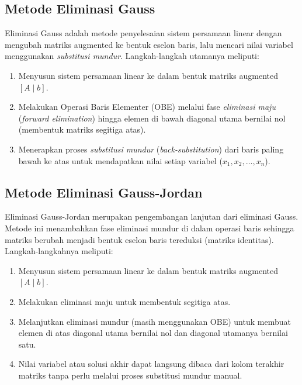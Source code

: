 \documentclass[12pt,a4paper]{report}
\begin{document}
\subsection{Metode Eliminasi Gauss}
Eliminasi Gauss adalah metode penyelesaian sistem persamaan linear dengan mengubah matriks augmented ke bentuk eselon baris, lalu mencari nilai variabel menggunakan \textit{substitusi mundur}. Langkah-langkah utamanya meliputi:
\begin{enumerate}
    \item Menyusun sistem persamaan linear ke dalam bentuk matriks augmented $[A \mid b]$.
    \item Melakukan Operasi Baris Elementer (OBE) melalui fase \textit{eliminasi maju} (\textit{forward elimination}) hingga elemen di bawah diagonal utama bernilai nol (membentuk matriks segitiga atas).
    \item Menerapkan proses \textit{substitusi mundur} (\textit{back-substitution}) dari baris paling bawah ke atas untuk mendapatkan nilai setiap variabel ($x_1, x_2, \dots, x_n$).
\end{enumerate}

\subsection{Metode Eliminasi Gauss-Jordan}
Eliminasi Gauss-Jordan merupakan pengembangan lanjutan dari eliminasi Gauss. Metode ini menambahkan fase eliminasi mundur di dalam operasi baris sehingga matriks berubah menjadi bentuk eselon baris tereduksi (matriks identitas). Langkah-langkahnya meliputi:
\begin{enumerate}
    \item Menyusun sistem persamaan linear ke dalam bentuk matriks augmented $[A \mid b]$.
    \item Melakukan eliminasi maju untuk membentuk segitiga atas.
    \item Melanjutkan eliminasi mundur (masih menggunakan OBE) untuk membuat elemen di atas diagonal utama bernilai nol dan diagonal utamanya bernilai satu.
    \item Nilai variabel atau solusi akhir dapat langsung dibaca dari kolom terakhir matriks tanpa perlu melalui proses substitusi mundur manual.
\end{enumerate}
\end{document}
